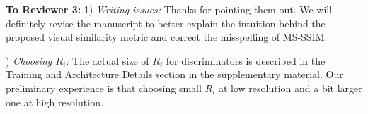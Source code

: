 \documentclass[10pt,twocolumn,letterpaper]{article}
\begin{document}
\noindent
\textbf{To Reviewer 3:} 1) \textit{Writing issues:} Thanks for pointing them out. We will definitely revise the manuscript to better explain the intuition behind the proposed visual similarity metric and correct the misspelling of MS-SSIM.

) \textit{Choosing $R_i$:} The actual size of $R_i$ for discriminators is described in the Training and Architecture Details section in the supplementary material. Our preliminary experience is that choosing small $R_i$ at low resolution and a bit larger one at high resolution.




%		

%
%
%
\end{document}
